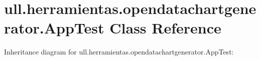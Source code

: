 \hypertarget{classull_1_1herramientas_1_1opendatachartgenerator_1_1_app_test}{}\section{ull.\+herramientas.\+opendatachartgenerator.\+App\+Test Class Reference}
\label{classull_1_1herramientas_1_1opendatachartgenerator_1_1_app_test}


Inheritance diagram for ull.\+herramientas.\+opendatachartgenerator.\+App\+Test\+:
